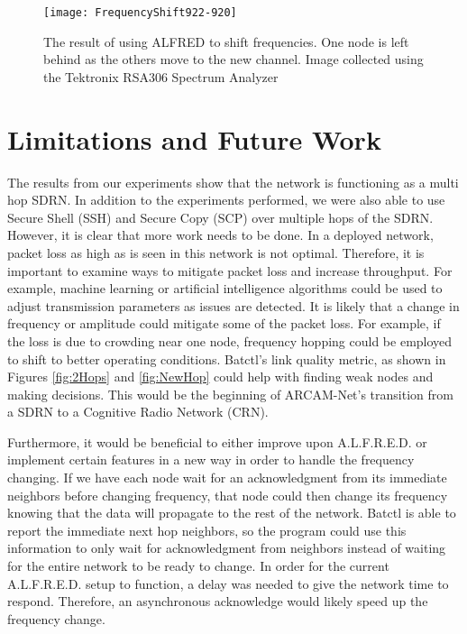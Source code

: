 \begin{figure}
	\centering
	\texttt{[image: FrequencyShift922-920]}
	\caption{The result of using ALFRED to shift frequencies. One node is left behind as the others move to the new channel. Image collected using the Tektronix RSA306 Spectrum Analyzer}
	\label{fig:freqshift}
\end{figure}

\section{Limitations and Future Work}

The results from our experiments show that the network is functioning as a multi hop SDRN. In addition to the experiments performed, we were also able to use Secure Shell (SSH) and Secure Copy (SCP) over multiple hops of the SDRN. However, it is clear that more work needs to be done. In a deployed network, packet loss as high as is seen in this network is not optimal. Therefore, it is important to examine ways to mitigate packet loss and increase throughput. For example, machine learning or artificial intelligence algorithms could be used to adjust transmission parameters as issues are detected. It is likely that a change in frequency or amplitude could mitigate some of the packet loss. For example, if the loss is due to crowding near one node, frequency hopping could be employed to shift to better operating conditions. Batctl's link quality metric, as shown in Figures \ref{fig:2Hops} and \ref{fig:NewHop} could help with finding weak nodes and making decisions. This would be the beginning of ARCAM-Net's transition from a SDRN to a Cognitive Radio Network (CRN). 

Furthermore, it would be beneficial to either improve upon A.L.F.R.E.D. or implement certain features in a new way in order to handle the frequency changing. If we have each node wait for an acknowledgment from its immediate neighbors before changing frequency, that node could then change its frequency knowing that the data will propagate to the rest of the network. Batctl is able to report the immediate next hop neighbors, so the program could use this information to only wait for acknowledgment from neighbors instead of waiting for the entire network to be ready to change. In order for the current A.L.F.R.E.D. setup to function, a delay was needed to give the network time to respond. Therefore, an asynchronous acknowledge would likely speed up the frequency change. 

